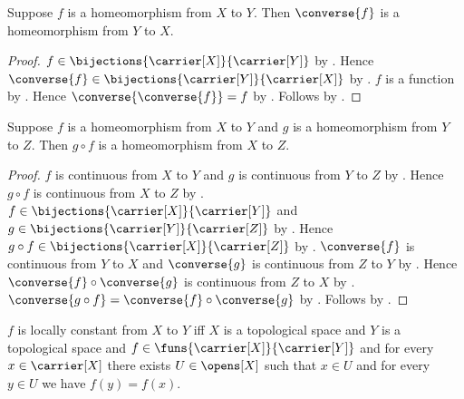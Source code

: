 \begin{classification}\label{homeomorphism_inverse}
    Suppose $f$ is a homeomorphism from $X$ to $Y$.
    Then $\converse{f}$ is a homeomorphism from $Y$ to $X$.
\end{classification}
\begin{proof}
    $f\in\bijections{\carrier[X]}{\carrier[Y]}$
        by .
    Hence $\converse{f}\in
        \bijections{\carrier[Y]}{\carrier[X]}$
        by .
    $f$ is a function by .
    Hence $\converse{\converse{f}}=f$
        by .
    Follows by .
\end{proof}

\begin{classification}\label{homeomorphism_composition}
    Suppose $f$ is a homeomorphism from $X$ to $Y$ and
        $g$ is a homeomorphism from $Y$ to $Z$.
    Then $g\circ f$ is a homeomorphism from $X$ to $Z$.
\end{classification}
\begin{proof}
    $f$ is continuous from $X$ to $Y$ and
        $g$ is continuous from $Y$ to $Z$
        by .
    Hence $g\circ f$ is continuous from $X$ to $Z$
        by .
    $f\in\bijections{\carrier[X]}{\carrier[Y]}$ and
        $g\in\bijections{\carrier[Y]}{\carrier[Z]}$
        by .
    Hence $g\circ f\in\bijections{\carrier[X]}{\carrier[Z]}$
        by .
    $\converse{f}$ is continuous from $Y$ to $X$ and
        $\converse{g}$ is continuous from $Z$ to $Y$
        by .
    Hence $\converse{f}\circ\converse{g}$ is continuous from $Z$ to $X$
        by .
    $\converse{g\circ f}=\converse{f}\circ\converse{g}$
        by .
    Follows by .
\end{proof}

\begin{definition}\label{locally_constant_map}
    $f$ is locally constant from $X$ to $Y$ iff
        $X$ is a topological space and
        $Y$ is a topological space and
        $f\in\funs{\carrier[X]}{\carrier[Y]}$ and
        for every $x\in\carrier[X]$ there exists $U\in\opens[X]$
            such that $x\in U$ and
            for every $y\in U$ we have $f(y)=f(x)$.
\end{definition}

